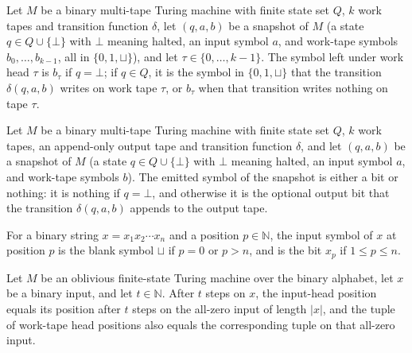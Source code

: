\begin{definition}
\label{Complexity.writtenOrKept}
\leanok
{}
Let $M$ be a binary multi-tape Turing machine with finite state set $Q$, $k$ work tapes and
transition function $\delta$, let $(q, a, b)$ be a snapshot of $M$ (a state
$q \in Q \cup \{\bot\}$ with $\bot$ meaning halted, an input symbol $a$, and work-tape symbols
$b_0, \dots, b_{k-1}$, all in $\{0, 1, \sqcup\}$), and let $\tau \in \{0, \dots, k-1\}$. The
symbol left under work head $\tau$ is $b_\tau$ if $q = \bot$; if $q \in Q$, it is the symbol
in $\{0, 1, \sqcup\}$ that the transition $\delta(q, a, b)$ writes on work tape $\tau$, or
$b_\tau$ when that transition writes nothing on tape $\tau$.
\end{definition}

\begin{definition}
\label{Complexity.emitted}
\leanok
{}
Let $M$ be a binary multi-tape Turing machine with finite state set $Q$, $k$ work tapes,
an append-only output tape and transition function $\delta$, and let $(q, a, b)$ be a
snapshot of $M$ (a state $q \in Q \cup \{\bot\}$ with $\bot$ meaning halted, an input symbol
$a$, and work-tape symbols $b$). The emitted symbol of the snapshot is either a bit or
nothing: it is nothing if $q = \bot$, and otherwise it is the optional output bit that the
transition $\delta(q, a, b)$ appends to the output tape.
\end{definition}

\begin{definition}
\label{Complexity.inputBitAt}
\leanok
For a binary string $x = x_1 x_2 \cdots x_n$ and a position $p \in \mathbb{N}$, the input
symbol of $x$ at position $p$ is the blank symbol $\sqcup$ if $p = 0$ or $p > n$, and is the
bit $x_p$ if $1 \le p \le n$.
\end{definition}

\begin{theorem}
\label{Complexity.oblivious_schedule_eq}
\leanok
{}
Let $M$ be an oblivious finite-state Turing machine over the binary alphabet, let $x$ be
a binary input, and let $t\in\mathbb{N}$. After $t$ steps on $x$, the input-head
position equals its position after $t$ steps on the all-zero input of length $|x|$, and
the tuple of work-tape head positions also equals the corresponding tuple on that
all-zero input.
\end{theorem}

